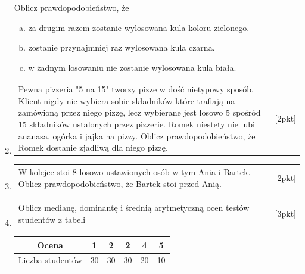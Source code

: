 \documentclass[12pt,a4paper]{article}
\begin{document}
\begin{enumerate}[1.]
		Oblicz prawdopodobieństwo, że
		
		\begin{enumerate}[a)]
			\item za drugim razem zostanie wylosowana kula koloru zielonego.
			\item zostanie przynajmniej raz wylosowana kula czarna.
			\item w żadnym losowaniu nie zostanie wylosowana kula biała.
		\end{enumerate}
		
		
		\item  \begin{tabular}{p{13cm} r}
			Pewna pizzeria "5 na 15" tworzy pizze w dość nietypowy sposób. Klient nigdy nie wybiera sobie składników które trafiają na zamówioną przez niego pizzę, lecz wybierane jest losowo 5 spośród 15 składników ustalonych przez pizzerie. Romek niestety nie lubi ananasa, ogórka i jajka na pizzy. Oblicz prawdopodobieństwo, że Romek dostanie zjadliwą dla niego pizzę.  &[2pkt]\\ 
		\end{tabular}
		
		\item  \begin{tabular}{p{13cm} r}
			W kolejce stoi 8 losowo ustawionych osób w tym Ania i Bartek. Oblicz prawdopodobieństwo, że Bartek stoi przed Anią.  &[2pkt]\\ 
		\end{tabular}
		
		\item  \begin{tabular}{p{13cm} r}
			Oblicz medianę, dominantę i średnią arytmetyczną ocen testów studentów z tabeli &[3pkt]\\ 
		\end{tabular}
		
		\begin{tabular}{|c|c|c|c|c|c|}
			\hline
			Ocena&1&2&2&4&5\\
			\hline
			Liczba studentów&30&30&30&20&10\\
			\hline
		\end{tabular}
		
	\end{enumerate}
	
\end{document}
